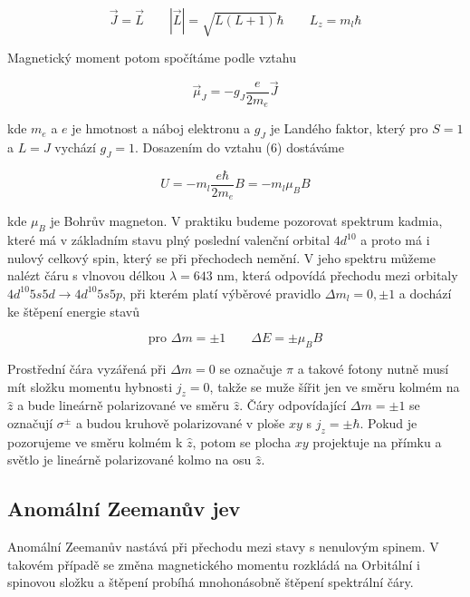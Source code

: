 \documentclass[a4paper,11pt]{article}
\begin{document}
\begin{equation}
    \vec{J} = \vec{L} \quad \quad | \vec{L} | = \sqrt{L(L + 1)}  \hbar \quad \quad L_z = m_l \hbar
\end{equation}

\noindent
Magnetický moment potom spočítáme podle vztahu

\begin{equation}
\vec{\mu}_J = - g_J \frac{e}{2 m_e} \vec{J}
\end{equation}

\noindent
kde $ m_e $ a $ e $ je hmotnost a náboj elektronu a $ g_J $ je Landého faktor, který pro $ S=1 $ a $ L=J $ vychází $ g_J = 1 $. Dosazením do vztahu (6) dostáváme

\begin{equation}
U = - m_l \frac{e \hbar}{2m_e} B = - m_l \mu_B B
\end{equation}

\noindent

kde $ \mu_B $ je Bohrův magneton. V praktiku budeme pozorovat spektrum kadmia, které má v základním stavu plný poslední valenční orbital $ 4d^{10} $ a proto má i nulový celkový spin, který se při přechodech nemění. V jeho spektru můžeme nalézt čáru s vlnovou délkou $ \lambda = 643 $ nm, která odpovídá přechodu mezi orbitaly $ 4d^{10}5s5d \rightarrow 4d^{10}5s5p   $, při kterém platí výběrové pravidlo $ \Delta m_l = 0, \pm 1 $ a dochází ke štěpení energie stavů 

\begin{equation}
\text{pro } \Delta m = \pm 1 \quad  \quad  \Delta E = \pm \mu_B B
\end{equation}

Prostřední čára vyzářená při $ \Delta m = 0 $  se označuje $ \pi $ a takové fotony nutně musí mít složku momentu hybnosti $ j_z = 0 $, takže se muže šířit jen ve směru kolmém na $ \hat{z} $ a bude lineárně polarizované ve směru $ \hat{z} $. Čáry odpovídající $ \Delta m = \pm 1 $ se označují $ \sigma^\pm $ a budou kruhově polarizované v ploše $ xy $ s  $ j_z = \pm \hbar $. Pokud je pozorujeme ve směru kolmém k $ \hat{z} $, potom se plocha $ xy $ projektuje na přímku a světlo je lineárně polarizované kolmo na osu $ \hat{z} $. 

\subsection{Anomální Zeemanův jev}

Anomální Zeemanův nastává při přechodu mezi stavy s nenulovým spinem. V takovém případě se změna magnetického momentu rozkládá na Orbitální i spinovou složku a štěpení probíhá mnohonásobně štěpení spektrální čáry.
\end{document}
